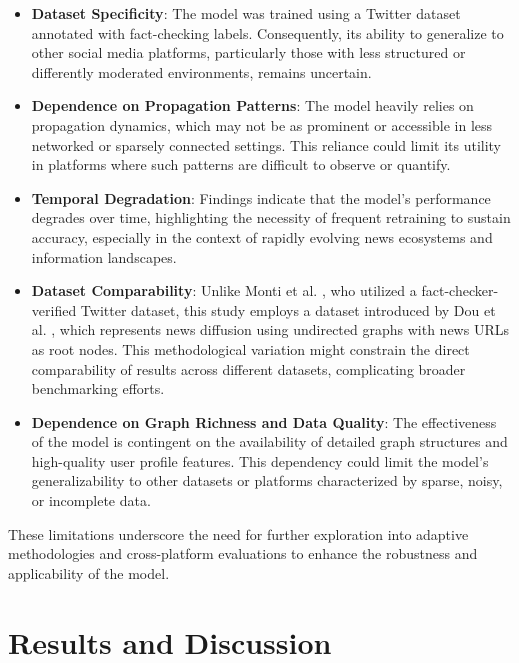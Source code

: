 \documentclass[sigconf,nonacm]{acmart}
\begin{document}
\begin{itemize}
    \item \textbf{Dataset Specificity}: The model was trained using a Twitter dataset annotated with fact-checking labels. Consequently, its ability to generalize to other social media platforms, particularly those with less structured or differently moderated environments, remains uncertain.

    \item \textbf{Dependence on Propagation Patterns}: The model heavily relies on propagation dynamics, which may not be as prominent or accessible in less networked or sparsely connected settings. This reliance could limit its utility in platforms where such patterns are difficult to observe or quantify.

    \item \textbf{Temporal Degradation}: Findings indicate that the model's performance degrades over time, highlighting the necessity of frequent retraining to sustain accuracy, especially in the context of rapidly evolving news ecosystems and information landscapes.

    \item \textbf{Dataset Comparability}: Unlike Monti et al. \cite{monti2019fakenewsdetectionsocial}, who utilized a fact-checker-verified Twitter dataset, this study employs a dataset introduced by Dou et al. \cite{10.1145/3404835.3462990}, which represents news diffusion using undirected graphs with news URLs as root nodes. This methodological variation might constrain the direct comparability of results across different datasets, complicating broader benchmarking efforts.

    \item \textbf{Dependence on Graph Richness and Data Quality}: The effectiveness of the model is contingent on the availability of detailed graph structures and high-quality user profile features. This dependency could limit the model’s generalizability to other datasets or platforms characterized by sparse, noisy, or incomplete data.
\end{itemize}

These limitations underscore the need for further exploration into adaptive methodologies and cross-platform evaluations to enhance the robustness and applicability of the model.



\section{Results and Discussion}
\end{document}
